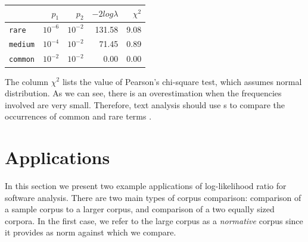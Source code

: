 \documentclass[10pt]{book}
\begin{document}
\begin{center}
\begin{tabular}{l | rrrr}
~ & $p_1$ & $p_2$ & $-2log\lambda$ & $\chi^2$ \\ 
\hline
\verb$rare$ & $10^{-6}$ & $10^{-2}$  & 131.58 & 9.08 \\
\verb$medium$ & $10^{-4}$ & $10^{-2}$  & 71.45 & 0.89 \\
\verb$common$ & $10^{-2}$ & $10^{-2}$  & 0.00 & 0.00 \\
\end{tabular}
\end{center}

The column $\chi^2$ lists the value of Pearson's chi-square test, which assumes normal distribution. As we can see, there is an overestimation when the frequencies involved are very small. Therefore, text analysis should use \loglr{}s to compare the occurrences of common and rare terms \cite{Dunning}.


\section{Applications}\label{applications}

In this section we present two example applications of log-likelihood ratio for software analysis.
There are two main types of corpus comparison: comparison of a sample corpus to a larger corpus, and comparison of a two equally sized corpora. In the first case, we refer to the large corpus as a \emph{normative} corpus since it provides as norm against which we compare.
\end{document}
